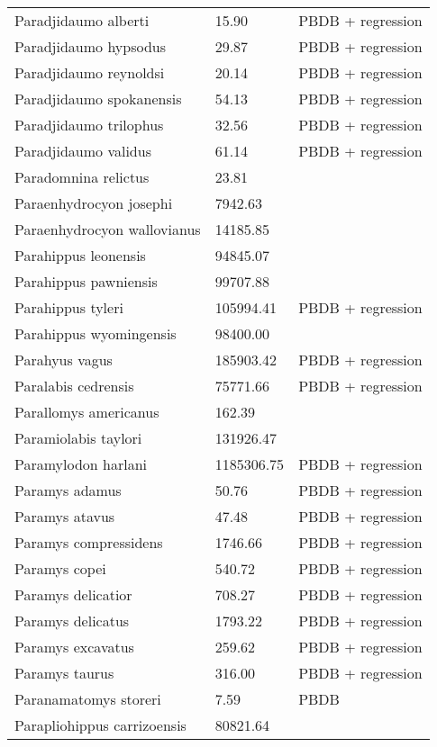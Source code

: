 \begin{center}
\begin{longtable}{p{} p{} p{} }
  Paradjidaumo alberti & 15.90 & PBDB + regression \\ 
  Paradjidaumo hypsodus & 29.87 & PBDB + regression \\ 
  Paradjidaumo reynoldsi & 20.14 & PBDB + regression \\ 
  Paradjidaumo spokanensis & 54.13 & PBDB + regression \\ 
  Paradjidaumo trilophus & 32.56 & PBDB + regression \\ 
  Paradjidaumo validus & 61.14 & PBDB + regression \\ 
  Paradomnina relictus & 23.81 & \cite{Tomiya2013} \\ 
  Paraenhydrocyon josephi & 7942.63 & \cite{Tomiya2013} \\ 
  Paraenhydrocyon wallovianus & 14185.85 & \cite{Tomiya2013} \\ 
  Parahippus leonensis & 94845.07 & \cite{Tomiya2013} \\ 
  Parahippus pawniensis & 99707.88 & \cite{Tomiya2013} \\ 
  Parahippus tyleri & 105994.41 & PBDB + regression \\ 
  Parahippus wyomingensis & 98400.00 & \cite{MacFadden1986} \\ 
  Parahyus vagus & 185903.42 & PBDB + regression \\ 
  Paralabis cedrensis & 75771.66 & PBDB + regression \\ 
  Parallomys americanus & 162.39 & \cite{Tomiya2013} \\ 
  Paramiolabis taylori & 131926.47 & \cite{Tomiya2013} \\ 
  Paramylodon harlani & 1185306.75 & PBDB + regression \\ 
  Paramys adamus & 50.76 & PBDB + regression \\ 
  Paramys atavus & 47.48 & PBDB + regression \\ 
  Paramys compressidens & 1746.66 & PBDB + regression \\ 
  Paramys copei & 540.72 & PBDB + regression \\ 
  Paramys delicatior & 708.27 & PBDB + regression \\ 
  Paramys delicatus & 1793.22 & PBDB + regression \\ 
  Paramys excavatus & 259.62 & PBDB + regression \\ 
  Paramys taurus & 316.00 & PBDB + regression \\ 
  Paranamatomys storeri & 7.59 & PBDB \\ 
  Parapliohippus carrizoensis & 80821.64 & \cite{Tomiya2013} \\ 

\end{longtable}
\end{center}
